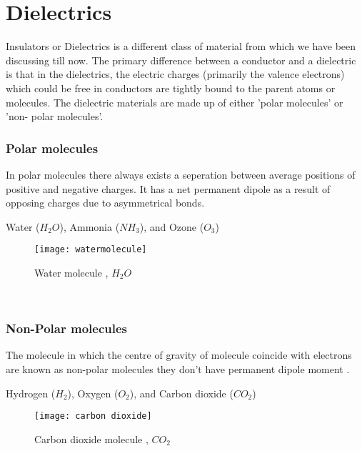 \section{Dielectrics}
Insulators or Dielectrics is a different class of material from which we have been discussing till now. The primary difference between a conductor and a dielectric is that in the dielectrics, the electric charges (primarily the valence electrons)   which could be free in conductors are tightly bound to the parent atoms or molecules. The dielectric materials are made up of either 'polar molecules' or 'non- polar molecules'.\\
\begin{minipage}{0.60\textwidth}
	\subsubsection{Polar molecules}
	In polar molecules there always exists a seperation between average positions of positive and negative charges. It has a net permanent dipole as a result of opposing charges due to asymmetrical bonds.
	\begin{example}
		Water ($ H_{2}O $), Ammonia ($ NH_{3} $), and Ozone ($ O_{3} $)
	\end{example}  
\end{minipage}\hfil
\begin{minipage}{0.30\textwidth}
	\begin{figure}[H]
		\centering
		\texttt{[image: watermolecule]}
		\caption{ Water molecule , $H_{2}O$}
		\label{}
	\end{figure}
\end{minipage}\\
\begin{minipage}{0.60\textwidth}
	\subsubsection{Non-Polar molecules}
	The molecule in which the centre of gravity of molecule coincide  with electrons are known as non-polar molecules they don't have permanent dipole moment .
	\begin{example}
		Hydrogen ($ H_{2} $), Oxygen ($ O_{2} $), and Carbon dioxide ($ CO_{2} $)
	\end{example} 
\end{minipage}\hfil
\begin{minipage}{0.30\textwidth}
	\begin{figure}[H]
		\centering
		\texttt{[image: carbon dioxide]}
		\caption{Carbon dioxide molecule , $CO_{2}$}
		\label{}
	\end{figure}
\end{minipage}
